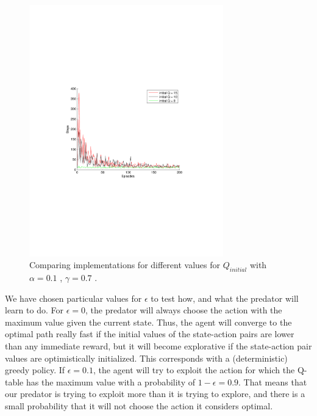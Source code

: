 \documentclass[a4paper,11pt]{article}
\begin{document}
\begin{figure}[t!]
  \centering
    \includegraphics[trim=4cm 8.5cm 4cm 8.5cm,clip,width=0.75\textwidth]{figures/qcomp.pdf}
    \caption{Comparing implementations for different values for $Q_{initial}$  with $\alpha = 0.1$ , $\gamma=0.7$ .}
    \label{qcomp}
\end{figure}



We have chosen particular values for $\epsilon$ to test how, and what the predator will learn to do. For $\epsilon = 0$, the predator will always choose the action with the maximum value given the current state. Thus, the agent will converge to the optimal path really fast if the initial values of the state-action pairs are lower than any immediate reward, but it will become explorative if the state-action pair values are optimistically initialized.  This corresponds with a (deterministic) greedy policy. If $\epsilon = 0.1$, the agent will try to exploit the action for which the Q-table has the maximum value with a probability of $1-\epsilon = 0.9$. That means that our predator is trying to exploit more than it is trying to explore, and there is a small probability that it will not choose the action it considers optimal.
\end{document}

